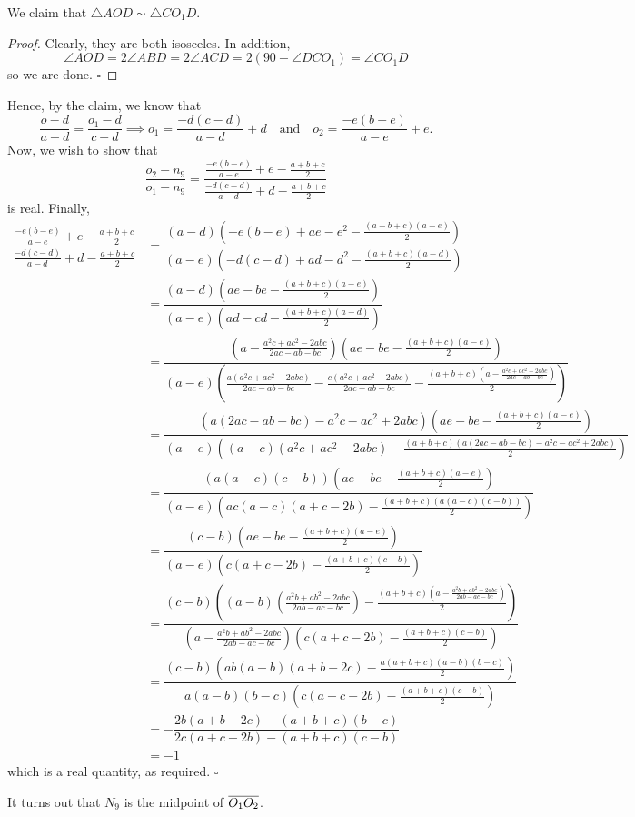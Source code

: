 \documentclass{article}
\begin{document}
\begin{claim*}
We claim that $\triangle AOD \sim \triangle CO_1D$. 
\end{claim*}
\begin{proof}
Clearly, they are both isosceles. In addition, \[\angle AOD = 2\angle ABD = 2\angle ACD = 2(90-\angle DCO_1) = \angle CO_1D\] so we are done. $\square$
\end{proof}

Hence, by the claim, we know that \[\dfrac{o-d}{a-d} = \dfrac{o_1-d}{c-d} \implies o_1 = \dfrac{-d(c-d)}{a-d}+d \quad \text{and} \quad o_2 = \dfrac{-e(b-e)}{a-e}+e.\] Now, we wish to show that \[\dfrac{o_2-n_9}{o_1-n_9} = \dfrac{\tfrac{-e(b-e)}{a-e}+e-\tfrac{a+b+c}{2}}{\tfrac{-d(c-d)}{a-d}+d-\tfrac{a+b+c}{2}}\] is real. Finally,
\begin{align*}
\dfrac{\tfrac{-e(b-e)}{a-e}+e-\tfrac{a+b+c}{2}}{\tfrac{-d(c-d)}{a-d}+d-\tfrac{a+b+c}{2}} &= \dfrac{(a-d)\left(-e(b-e)+ae-e^2-\tfrac{(a+b+c)(a-e)}{2}\right)}{(a-e)\left(-d(c-d)+ad-d^2-\tfrac{(a+b+c)(a-d)}{2}\right)} \\
&= \dfrac{(a-d)\left(ae-be-\tfrac{(a+b+c)(a-e)}{2}\right)}{(a-e)\left(ad-cd-\tfrac{(a+b+c)(a-d)}{2}\right)} \\
&= \dfrac{(a-\tfrac{a^2c+ac^2-2abc}{2ac-ab-bc})\left(ae-be-\tfrac{(a+b+c)(a-e)}{2}\right)}{(a-e)\left(\tfrac{a(a^2c+ac^2-2abc)}{2ac-ab-bc}-\tfrac{c(a^2c+ac^2-2abc)}{2ac-ab-bc}-\tfrac{(a+b+c)\left(a-\tfrac{a^2c+ac^2-2abc}{2ac-ab-bc}\right)}{2}\right)} \\
&= \dfrac{(a(2ac-ab-bc)-a^2c-ac^2+2abc)\left(ae-be-\tfrac{(a+b+c)(a-e)}{2}\right)}{(a-e)\left((a-c)(a^2c+ac^2-2abc)-\tfrac{(a+b+c)\left(a(2ac-ab-bc)-a^2c-ac^2+2abc\right)}{2}\right)} \\
&= \dfrac{(a(a-c)(c-b))\left(ae-be-\tfrac{(a+b+c)(a-e)}{2}\right)}{(a-e)\left(ac(a-c)(a+c-2b)-\tfrac{(a+b+c)\left(a(a-c)(c-b)\right)}{2}\right)} \\
&= \dfrac{(c-b)\left(ae-be-\tfrac{(a+b+c)(a-e)}{2}\right)}{(a-e)\left(c(a+c-2b)-\tfrac{(a+b+c)(c-b)}{2}\right)} \\
&= \dfrac{(c-b)\left((a-b)\left(\tfrac{a^2b+ab^2-2abc}{2ab-ac-bc}\right)-\tfrac{(a+b+c)\left(a-\tfrac{a^2b+ab^2-2abc}{2ab-ac-bc}\right)}{2}\right)}{\left(a-\tfrac{a^2b+ab^2-2abc}{2ab-ac-bc}\right)\left(c(a+c-2b)-\tfrac{(a+b+c)(c-b)}{2}\right)} \\
&= \dfrac{(c-b)\left(ab(a-b)\left(a+b-2c\right)-\tfrac{a(a+b+c)(a-b)(b-c)}{2}\right)}{a(a-b)(b-c)\left(c(a+c-2b)-\tfrac{(a+b+c)(c-b)}{2}\right)} \\
&= -\dfrac{2b\left(a+b-2c\right)-(a+b+c)(b-c)}{2c(a+c-2b)-(a+b+c)(c-b)} \\
&= -1
\end{align*}
which is a real quantity, as required. $\square$
\begin{remark*}
It turns out that $N_9$ is the midpoint of $\overline{O_1O_2}$.
\end{remark*}
\end{document}
